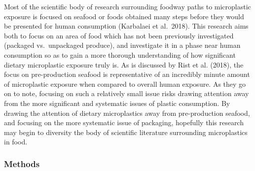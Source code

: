 \documentclass[]{article}
\begin{document}
Most of the scientific body of research surrounding foodway paths to
microplastic exposure is focused on seafood or foods obtained many steps
before they would be presented for human consumption (Karbalaei et
al.~2018). This research aims both to focus on an area of food which has
not been previously investigated (packaged vs.~unpackaged produce), and
investigate it in a phase near human consumption so as to gain a more
thorough understanding of how significant dietary microplastic exposure
truly is. As is discussed by Rist et al. (2018), the focus on
pre-production seafood is representative of an incredibly minute amount
of microplastic exposure when compared to overall human exposure. As
they go on to note, focusing on such a relatively small issue risks
drawing attention away from the more significant and systematic issues
of plastic consumption. By drawing the attention of dietary
microplastics away from pre-production seafood, and focusing on the more
systematic issue of packaging, hopefully this research may begin to
diversity the body of scientific literature surrounding microplastics in
food.~

\hypertarget{methods}{%
\subsubsection{Methods}\label{methods}}
\end{document}
